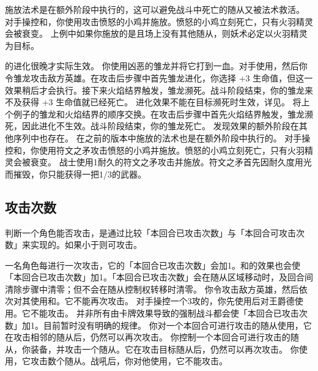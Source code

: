 施放法术是在额外阶段中执行的，这可以避免战斗中死亡的随从又被法术救活。
\example 对手操控和，你使用攻击愤怒的小鸡并施放。愤怒的小鸡立刻死亡，只有火羽精灵会被衰变。
\example 上例中如果你施放的是且场上没有其他随从，则妖术必定以火羽精灵为目标。

的进化很晚才实际生效。
\example 你使用凶恶的雏龙并将它打到一血。对手使用，然后你令雏龙攻击敌方英雄。在攻击后步骤中首先雏龙进化，你选择 +3 生命值，但这一效果稍后才会执行。接下来火焰结界触发，雏龙濒死。战斗阶段结束，你的雏龙来不及获得 +3 生命值就已经死亡。
\notice 进化效果不能在目标濒死时生效，详见。
\example 将上个例子的雏龙和火焰结界的顺序交换。在攻击后步骤中首先火焰结界触发，雏龙濒死，因此进化不生效。战斗阶段结束，你的雏龙死亡。
\notice {}发现效果的额外阶段在其他序列中也存在。
\notice {}在之前的版本中施放的法术也是在额外阶段中执行的。
\example {}对手操控和，你使用符文之矛攻击愤怒的小鸡并施放。愤怒的小鸡立刻死亡，只有火羽精灵会被衰变。
\example {}战士使用1耐久的符文之矛攻击并施放。符文之矛首先因耐久度用光而摧毁，你只能获得一把1/3的武器。

\subsection{攻击次数}

判断一个角色能否攻击，是通过比较「本回合已攻击次数」与「本回合可攻击次数」来实现的。如果小于则可攻击。

一名角色每进行一次攻击，它的「本回合已攻击次数」会加1。和的效果也会使「本回合已攻击次数」加1。「本回合已攻击次数」会在随从区域移动时，及回合间清除步骤中清零；但不会在随从控制权转移时清零。
\example 你令攻击敌方英雄，然后依次对其使用和。它不能再次攻击。
\example 对手操控一个3攻的，你先使用后对王爵德使用。它不能攻击。
\notice 并非所有由卡牌效果导致的强制战斗都会使「本回合已攻击次数」加1。目前暂时没有明确的规律。
\example 你对一个本回合可进行攻击的随从使用，它在攻击相邻的随从后，仍然可以再次攻击。
\example 你控制一个本回合可进行攻击的随从，你装备，并攻击一个随从。它在攻击目标随从后，仍然可以再次攻击。
\example 你使用，它攻击数个随从。战吼后，你对他使用，它不能攻击。

